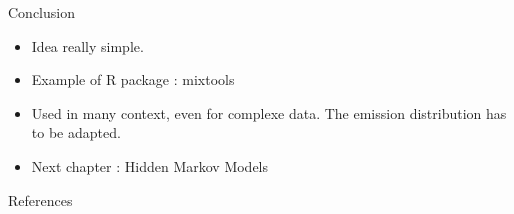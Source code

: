 \documentclass[compress,10pt]{beamer}
\begin{document}
\begin{frame}{Conclusion}
 
\begin{itemize}
 \item Idea really simple. 
 \item Example of \textsf{R} package : mixtools
 \item Used in many context, even for complexe data. The emission distribution has to be adapted. 
 \item Next chapter : Hidden Markov Models
\end{itemize}
 
 
\end{frame}




\begin{frame}{References}

 
\end{frame}
\end{document}
